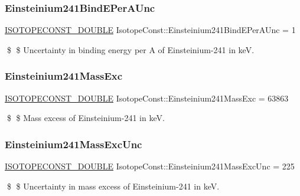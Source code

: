 \subsubsection{\texorpdfstring{Einsteinium241\+Bind\+E\+Per\+A\+Unc}{Einsteinium241BindEPerAUnc}}
{\footnotesize\ttfamily \mbox{\hyperlink{group___isotope_const-_macros_ga8f45a7272ce02c0b4c65c44636ed719a}{I\+S\+O\+T\+O\+P\+E\+C\+O\+N\+S\+T\+\_\+\+D\+O\+U\+B\+LE}} Isotope\+Const\+::\+Einsteinium241\+Bind\+E\+Per\+A\+Unc = 1}

\$ \$ Uncertainty in binding energy per A of Einsteinium-\/241 in keV. \mbox{\label{group___isotope_const-_einsteinium-_es241_gacf3f7323545ec59f8279b7d8a196221c}} 
\subsubsection{\texorpdfstring{Einsteinium241\+Mass\+Exc}{Einsteinium241MassExc}}
{\footnotesize\ttfamily \mbox{\hyperlink{group___isotope_const-_macros_ga8f45a7272ce02c0b4c65c44636ed719a}{I\+S\+O\+T\+O\+P\+E\+C\+O\+N\+S\+T\+\_\+\+D\+O\+U\+B\+LE}} Isotope\+Const\+::\+Einsteinium241\+Mass\+Exc = 63863}

\$ \$ Mass excess of Einsteinium-\/241 in keV. \mbox{\label{group___isotope_const-_einsteinium-_es241_ga73e4be2d22c28666ce14421e65804692}} 
\subsubsection{\texorpdfstring{Einsteinium241\+Mass\+Exc\+Unc}{Einsteinium241MassExcUnc}}
{\footnotesize\ttfamily \mbox{\hyperlink{group___isotope_const-_macros_ga8f45a7272ce02c0b4c65c44636ed719a}{I\+S\+O\+T\+O\+P\+E\+C\+O\+N\+S\+T\+\_\+\+D\+O\+U\+B\+LE}} Isotope\+Const\+::\+Einsteinium241\+Mass\+Exc\+Unc = 225}

\$ \$ Uncertainty in mass excess of Einsteinium-\/241 in keV. \mbox{\label{group___isotope_const-_einsteinium-_es241_gaf6a69d5a0b8b65a4b7994261f7a9a894}} 

